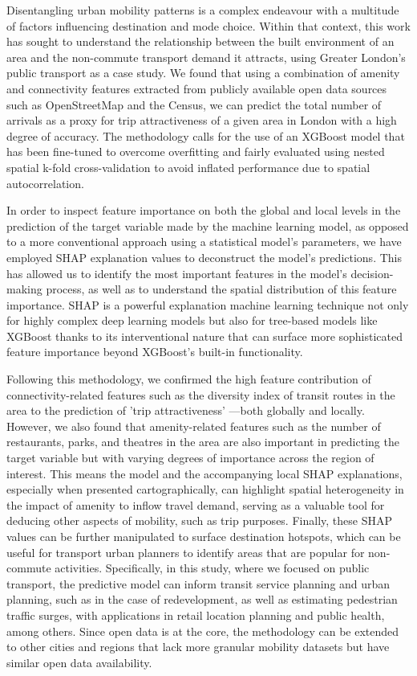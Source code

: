 
Disentangling urban mobility patterns is a complex endeavour with a multitude of factors influencing destination and mode choice. Within that context, this work has sought to understand the relationship between the built environment of an area and the non-commute transport demand it attracts, using Greater London's public transport as a case study. We found that using a combination of amenity and connectivity features extracted from publicly available open data sources such as OpenStreetMap and the Census, we can predict the total number of arrivals as a proxy for trip attractiveness of a given area in London with a high degree of accuracy. The methodology calls for the use of an XGBoost model that has been fine-tuned to overcome overfitting and fairly evaluated using nested spatial k-fold cross-validation to avoid inflated performance due to spatial autocorrelation. 

In order to inspect feature importance on both the global and local levels in the prediction of the target variable made by the machine learning model, as opposed to a more conventional approach using a statistical model's parameters, we have employed SHAP explanation values to deconstruct the model's predictions. This has allowed us to identify the most important features in the model's decision-making process, as well as to understand the spatial distribution of this feature importance. SHAP is a powerful explanation machine learning technique not only for highly complex deep learning models but also for tree-based models like XGBoost thanks to its interventional nature that can surface more sophisticated feature importance beyond XGBoost's built-in functionality.

Following this methodology, we confirmed the high feature contribution of connectivity-related features such as the diversity index of transit routes in the area to the prediction of 'trip attractiveness' ---both globally and locally. However, we also found that amenity-related features such as the number of restaurants, parks, and theatres in the area are also important in predicting the target variable but with varying degrees of importance across the region of interest. This means the model and the accompanying local SHAP explanations, especially when presented cartographically, can highlight spatial heterogeneity in the impact of amenity to inflow travel demand, serving as a valuable tool for deducing other aspects of mobility, such as trip purposes. Finally, these SHAP values can be further manipulated to surface destination hotspots, which can be useful for transport urban planners to identify areas that are popular for non-commute activities. Specifically, in this study, where we focused on public transport, the predictive model can inform transit service planning and urban planning, such as in the case of redevelopment, as well as estimating pedestrian traffic surges, with applications in retail location planning and public health, among others. Since open data is at the core, the methodology can be extended to other cities and regions that lack more granular mobility datasets but have similar open data availability.

